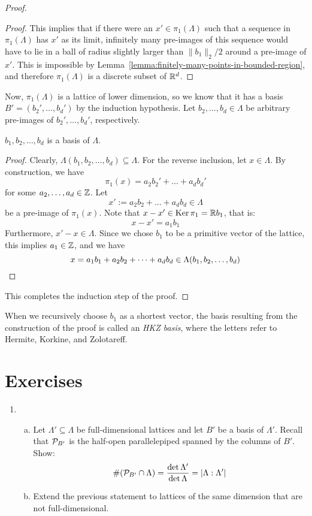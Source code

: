 \begin{proof}
\begin{proof}
    This implies that if there were an $x' \in \pi_1(\Lambda)$
    such that a sequence in $\pi_1(\Lambda)$ has $x'$ as its limit,
    infinitely many pre-images of this sequence would have to lie
    in a ball of radius slightly larger than $\|b_1\|_2/2$
    around a pre-image of $x'$.
    This is impossible by Lemma~\ref{lemma:finitely-many-points-in-bounded-region},
    and therefore $\pi_1(\Lambda)$ is a discrete subset of $\mathbb{R}^d$.
  \end{proof}
  Now, $\pi_1(\Lambda)$ is a lattice of lower dimension,
  so we know that it has a basis $B' = (b_2',\ldots,b_d')$ by the induction hypothesis.
  Let $b_2, \ldots, b_d \in \Lambda$ be arbitrary pre-images of $b_2', \ldots, b_d'$, respectively.

  \begin{claim}
    $b_1, b_2, \ldots, b_d$ is a basis of $\Lambda$.
  \end{claim}
  \begin{proof}
    Clearly, $\Lambda(b_1,b_2,\ldots,b_d) \subseteq \Lambda$.
    For the reverse inclusion, let $x \in \Lambda$.
    By construction, we have
    \[
      \pi_1(x) = a_2 b_2' + \dots + a_d b_d'
    \]
    for some $a_2, \ldots, a_d \in \mathbb{Z}$.
    Let
    \[
      x' := a_2 b_2 + \dots + a_d b_d \in \Lambda
    \]
    be a pre-image of $\pi_1(x)$.
    Note that $x - x' \in \operatorname{Ker} \pi_1 = \mathbb{R} b_1$, that is:
    \[
      x - x' = a_1 b_1
    \]
    Furthermore, $x' - x \in \Lambda$.
    Since we chose $b_1$ to be a primitive vector of the lattice, this implies $a_1 \in \mathbb{Z}$,
    and we have
    \[
      x = a_1 b_1 + a_2 b_2 + \dots + a_d b_d \in \Lambda(b_1,b_2,\ldots,b_d) \qedhere
    \]
  \end{proof}
  This completes the induction step of the proof.
\end{proof}

\begin{remark}
  When we recursively choose $b_1$ as a shortest vector,
  the basis resulting from the construction of the proof is called
  an \emph{HKZ basis}, where the letters refer to Hermite, Korkine, and Zolotareff.
\end{remark}



\section*{Exercises}

\begin{enumerate}
  \item
  \begin{enumerate}[(a)]
    \item
    Let $\Lambda' \subseteq \Lambda$ be full-dimensional lattices and let $B'$ be a basis of $\Lambda'$.
    Recall that $\mathcal{P}_{B'}$ is the half-open parallelepiped spanned by the columns of $B'$.
    Show:
    \[ \#(\mathcal{P}_{B'} \cap \Lambda) = \frac{\det \Lambda'}{\det \Lambda} = |\Lambda : \Lambda'| \]

    \item Extend the previous statement to lattices of the same dimension that are not full-dimensional.
  \end{enumerate}
\end{enumerate}

